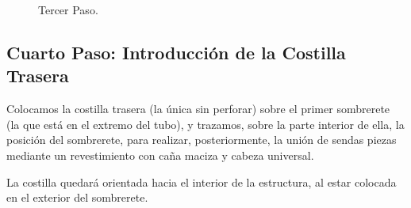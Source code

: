 \begin{figure}[!htb]
\centering
{}
\caption{Tercer Paso. \label{fig:ter}}
\end{figure}


\subsection{Cuarto Paso: Introducción de la Costilla Trasera}
Colocamos la costilla trasera (la única sin perforar) sobre el primer sombrerete (la que está en el extremo del tubo), y trazamos, sobre la parte interior de ella, la posición del sombrerete, para realizar, posteriormente, la unión de sendas piezas mediante un revestimiento con caña maciza y cabeza universal.

La costilla quedará orientada hacia el interior de la estructura, al estar colocada en el exterior del sombrerete.

